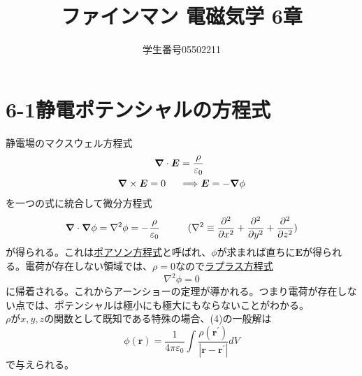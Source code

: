 \documentclass{jsarticle}
\title{ファインマン 電磁気学 6章}
\author{学生番号05502211}
\date{}
\begin{document}
\maketitle
\section*{6-1\hspace{5mm}静電ポテンシャルの方程式}
\noindent
静電場のマクスウェル方程式
\begin{align}
\bm{\nabla}\cdot\bm{E}&=\frac{\rho}{\varepsilon_{0}}\\
\bm{\nabla}\times\bm{E}=0\hspace{5mm}&\Longrightarrow\bm{E}=-\bm{\nabla}\phi
\end{align}
を一つの式に統合して微分方程式
\begin{equation}
\bm{\nabla}\cdot\bm{\nabla}\phi={\nabla}^{2}\phi=-\frac{\rho}{\varepsilon_{0}}\hspace{10mm}(\nabla^{2}\equiv\frac{\partial^{2}}{\partial x^{2}}+\frac{\partial^{2}}{\partial y^{2}}+\frac{\partial^{2}}{\partial z^{2}})
\end{equation}
が得られる。これは\underline{ポアソン方程式}と呼ばれ、\(\phi\)が求まれば直ちに\(\bm{E}\)が得られる。電荷が存在しない領域では、\(\rho=0\)なので\underline{ラプラス方程式}
\begin{equation}
{\nabla}^{2}\phi=0
\end{equation}
に帰着される。これからアーンショーの定理が導かれる。つまり電荷が存在しない点では、ポテンシャルは極小にも極大にもならないことがわかる。\\
\(\rho\)が\(x,y,z\)の関数として既知である特殊の場合、(4)の一般解は
\begin{equation}
\phi(\bm{r})=\frac{1}{4\pi\varepsilon_{0}}\int\frac{\rho(\bm{r}^{\prime})}{\left|\bm{r}-\bm{r}^{\prime}\right|}dV
\end{equation}
で与えられる。\\
\\

\newpage
\end{document}
